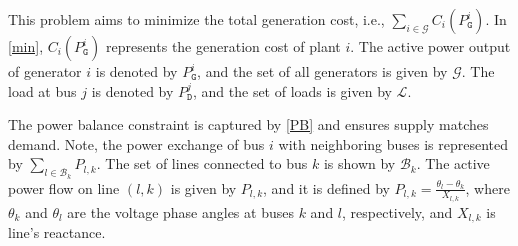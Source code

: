 
This problem aims to minimize the total generation cost, i.e., \( \sum_{i \in \mathcal{G}} C_i(P_{\texttt{G}}^{i}) \). In \eqref{min}, \( C_i(P_{\texttt{G}}^{i}) \) represents the generation cost of plant \( i \). The active power output of generator \( i \) is denoted by \( P_{\texttt{G}}^{i} \), and the set of all generators is given by \( \mathcal{G} \). The load at bus \( j \) is denoted by \( P_{\texttt{D}}^{j} \), and the set of loads is given by \( \mathcal{L} \).

The power balance constraint is captured by \eqref{PB} and ensures supply matches demand. Note, the power exchange of bus $i$ with neighboring buses is represented by \( \sum_{l \in \mathcal{B}_{k}} P_{l,k} \). The set of lines connected to bus \( k \) is shown by \( \mathcal{B}_{k} \).
%
The active power flow on line \( (l, k) \) is given by \( P_{l,k} \), and it is defined by \( P_{l,k} = \frac{\theta_{l} - \theta_{k}}{X_{l,k}} \), where \( \theta_{k} \) and \( \theta_{l} \) are the voltage phase angles at buses \( k \) and \( l \), respectively, and \( X_{l,k} \) is line's reactance.

